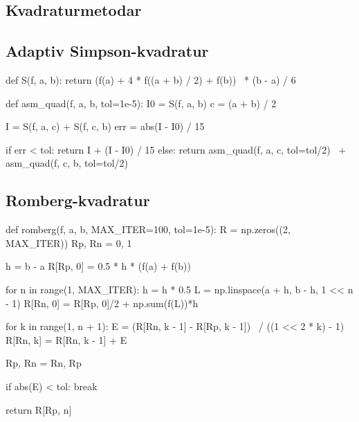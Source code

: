 \documentclass[12pt]{article}
\begin{document}
\begin{multicols*}{2}

    \section{Kvadraturmetodar}


    \subsection{Adaptiv Simpson-kvadratur}
\begin{python}[caption={Adaptiv Simpson-kvadratur}]
def S(f, a, b):
    return (f(a) + 4 * f((a + b) / 2) + f(b))  \
         * (b - a) / 6

def asm_quad(f, a, b, tol=1e-5):
    I0 = S(f, a, b)
    c = (a + b) / 2

    I = S(f, a, c) + S(f, c, b)
    err = abs(I - I0) / 15

    if err < tol:
        return I + (I - I0) / 15
    else:
        return asm_quad(f, a, c, tol=tol/2)  \
             + asm_quad(f, c, b, tol=tol/2)
\end{python}


    \subsection{Romberg-kvadratur}

\begin{python}[caption={Romberg-kvadratur}]
def romberg(f, a, b, MAX_ITER=100, tol=1e-5):
    R = np.zeros((2, MAX_ITER))
    Rp, Rn = 0, 1

    h = b - a
    R[Rp, 0] = 0.5 * h * (f(a) + f(b))

    for n in range(1, MAX_ITER):
        h = h * 0.5
        L = np.linspace(a + h, b - h, 1 << n - 1)
        R[Rn, 0] = R[Rp, 0]/2 + np.sum(f(L))*h

        for k in range(1, n + 1):
            E = (R[Rn, k - 1] - R[Rp, k - 1])  \
              / ((1 << 2 * k) - 1)
            R[Rn, k] = R[Rn, k - 1] + E

        Rp, Rn = Rn, Rp

        if abs(E) < tol: break

    return R[Rp, n]
\end{python}



\end{multicols*}
\end{document}
